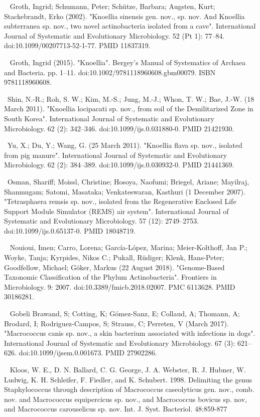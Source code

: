 \documentclass[11pt]{article}
\begin{document}
\begin{thebibliography}{3}
	~ Groth, Ingrid; Schumann, Peter; Schütze, Barbara; Augsten, Kurt; Stackebrandt, Erko (2002). "Knoellia sinensis gen. nov., sp. nov. And Knoellia subterranea sp. nov., two novel actinobacteria isolated from a cave". International Journal of Systematic and Evolutionary Microbiology. 52 (Pt 1): 77–84. doi:10.1099/00207713-52-1-77. PMID 11837319.
	
	~ Groth, Ingrid (2015). "Knoellia". Bergey's Manual of Systematics of Archaea and Bacteria. pp. 1–11. doi:10.1002/9781118960608.gbm00079. ISBN 9781118960608.
	
	~Shin, N.-R.; Roh, S. W.; Kim, M.-S.; Jung, M.-J.; Whon, T. W.; Bae, J.-W. (18 March 2011). "Knoellia locipacati sp. nov., from soil of the Demilitarized Zone in South Korea". International Journal of Systematic and Evolutionary Microbiology. 62 (2): 342–346. doi:10.1099/ijs.0.031880-0. PMID 21421930.
	
	~Yu, X.; Du, Y.; Wang, G. (25 March 2011). "Knoellia flava sp. nov., isolated from pig manure". International Journal of Systematic and Evolutionary Microbiology. 62 (2): 384–389. doi:10.1099/ijs.0.030932-0. PMID 21441369.
	
	~Osman, Shariff; Moissl, Christine; Hosoya, Naofumi; Briegel, Ariane; Mayilraj, Shanmugam; Satomi, Masataka; Venkateswaran, Kasthuri (1 December 2007). "Tetrasphaera remsis sp. nov., isolated from the Regenerative Enclosed Life Support Module Simulator (REMS) air system". International Journal of Systematic and Evolutionary Microbiology. 57 (12): 2749–2753. doi:10.1099/ijs.0.65137-0. PMID 18048719.
	
	~ Nouioui, Imen; Carro, Lorena; García-López, Marina; Meier-Kolthoff, Jan P.; Woyke, Tanja; Kyrpides, Nikos C.; Pukall, Rüdiger; Klenk, Hans-Peter; Goodfellow, Michael; Göker, Markus (22 August 2018). "Genome-Based Taxonomic Classification of the Phylum Actinobacteria". Frontiers in Microbiology. 9: 2007. doi:10.3389/fmicb.2018.02007. PMC 6113628. PMID 30186281.

	~ Gobeli Brawand, S; Cotting, K; Gómez-Sanz, E; Collaud, A; Thomann, A; Brodard, I; Rodriguez-Campos, S; Strauss, C; Perreten, V (March 2017). "Macrococcus canis sp. nov., a skin bacterium associated with infections in dogs". International Journal of Systematic and Evolutionary Microbiology. 67 (3): 621–626. doi:10.1099/ijsem.0.001673. PMID 27902286.
	
	~ Kloos, W. E., D. N. Ballard, C. G. George, J. A. Webster, R. J. Hubner, W. Ludwig, K. H. Schleifer, F. Fiedler, and K. Schubert. 1998. Delimiting the genus Staphylococcus through description of Macrococcus caseolyticus gen. nov., comb. nov. and Macrococcus equipercicus sp. nov., and Macrococcus bovicus sp. nov, and Macrococcus carouselicus sp. nov. Int. J. Syst. Bacteriol. 48:859-877
	

\end{thebibliography}
\end{document}
